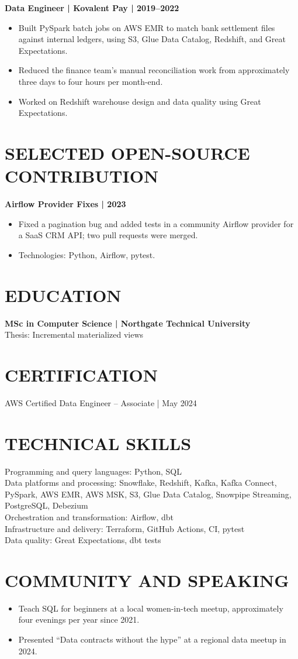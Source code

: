 \documentclass[11pt,a4paper]{article}
\newcommand{\jobline}[1]{\textbf{#1}\par}
\begin{document}
\jobline{Data Engineer | Kovalent Pay | 2019–2022}
\begin{itemize}
\item Built PySpark batch jobs on AWS EMR to match bank settlement files against internal ledgers, using S3, Glue Data Catalog, Redshift, and Great Expectations.
\item Reduced the finance team's manual reconciliation work from approximately three days to four hours per month-end.
\item Worked on Redshift warehouse design and data quality using Great Expectations.
\end{itemize}

\section*{SELECTED OPEN-SOURCE CONTRIBUTION}
\jobline{Airflow Provider Fixes | 2023}
\begin{itemize}
\item Fixed a pagination bug and added tests in a community Airflow provider for a SaaS CRM API; two pull requests were merged.
\item Technologies: Python, Airflow, pytest.
\end{itemize}

\section*{EDUCATION}
\textbf{MSc in Computer Science | Northgate Technical University}\\
Thesis: Incremental materialized views

\section*{CERTIFICATION}
AWS Certified Data Engineer – Associate | May 2024

\section*{TECHNICAL SKILLS}
Programming and query languages: Python, SQL\\
Data platforms and processing: Snowflake, Redshift, Kafka, Kafka Connect, PySpark, AWS EMR, AWS MSK, S3, Glue Data Catalog, Snowpipe Streaming, PostgreSQL, Debezium\\
Orchestration and transformation: Airflow, dbt\\
Infrastructure and delivery: Terraform, GitHub Actions, CI, pytest\\
Data quality: Great Expectations, dbt tests

\section*{COMMUNITY AND SPEAKING}
\begin{itemize}
\item Teach SQL for beginners at a local women-in-tech meetup, approximately four evenings per year since 2021.
\item Presented “Data contracts without the hype” at a regional data meetup in 2024.
\end{itemize}
\end{document}
